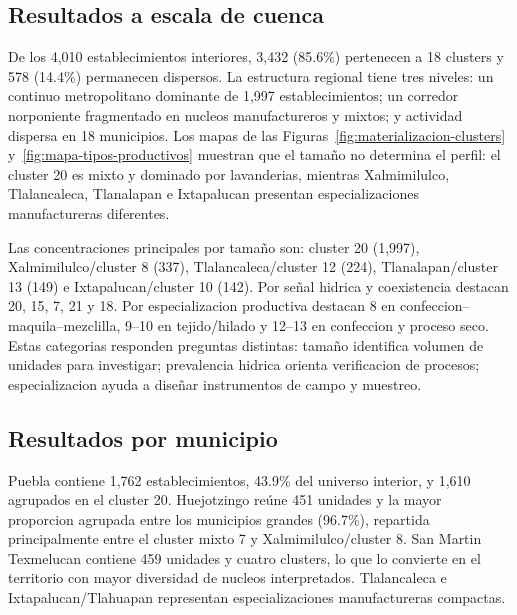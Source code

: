 \documentclass[11pt,letterpaper]{article}
\begin{document}
\subsection{Resultados a escala de cuenca}

De los 4,010 establecimientos interiores, 3,432 (85.6\%) pertenecen a 18 clusters y 578 (14.4\%) permanecen dispersos. La estructura regional tiene tres niveles: un continuo metropolitano dominante de 1,997 establecimientos; un corredor norponiente fragmentado en nucleos manufactureros y mixtos; y actividad dispersa en 18 municipios. Los mapas de las Figuras~\ref{fig:materializacion-clusters} y~\ref{fig:mapa-tipos-productivos} muestran que el tamaño no determina el perfil: el cluster 20 es mixto y dominado por lavanderias, mientras Xalmimilulco, Tlalancaleca, Tlanalapan e Ixtapalucan presentan especializaciones manufactureras diferentes.

Las concentraciones principales por tamaño son: cluster 20 (1,997), Xalmimilulco/cluster 8 (337), Tlalancaleca/cluster 12 (224), Tlanalapan/cluster 13 (149) e Ixtapalucan/cluster 10 (142). Por señal hidrica y coexistencia destacan 20, 15, 7, 21 y 18. Por especializacion productiva destacan 8 en confeccion--maquila--mezclilla, 9--10 en tejido/hilado y 12--13 en confeccion y proceso seco. Estas categorias responden preguntas distintas: tamaño identifica volumen de unidades para investigar; prevalencia hidrica orienta verificacion de procesos; especializacion ayuda a diseñar instrumentos de campo y muestreo.

\subsection{Resultados por municipio}

Puebla contiene 1,762 establecimientos, 43.9\% del universo interior, y 1,610 agrupados en el cluster 20. Huejotzingo reúne 451 unidades y la mayor proporcion agrupada entre los municipios grandes (96.7\%), repartida principalmente entre el cluster mixto 7 y Xalmimilulco/cluster 8. San Martin Texmelucan contiene 459 unidades y cuatro clusters, lo que lo convierte en el territorio con mayor diversidad de nucleos interpretados. Tlalancaleca e Ixtapalucan/Tlahuapan representan especializaciones manufactureras compactas.
\end{document}

